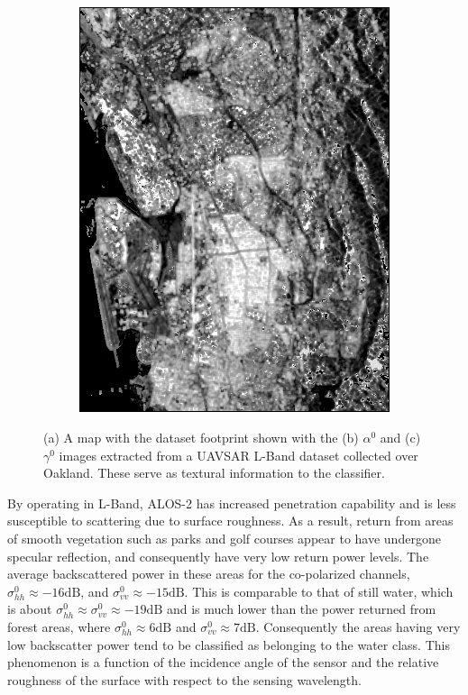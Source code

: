 \begin{figure}
\begin{subfigure}[t]{0.4\columnwidth}
	 \includegraphics[width = \columnwidth]{Figures/IGRASS15_WORK/gamma_5_5}
 	\caption{}
	 \end{subfigure}   
	 \caption{(a) A map with the dataset footprint shown with the (b) $\alpha^0$ and (c) $\gamma^0$ images extracted from a UAVSAR L-Band dataset collected over Oakland. These serve as textural information to the classifier.}
	 \label{fig:alphagamma}
\end{figure}


By operating in L-Band, ALOS-2 has increased penetration capability and is less susceptible to scattering due to surface roughness. As a result, return from areas of smooth vegetation such as parks and golf courses appear to have undergone specular reflection, and consequently have very low return power levels. The average backscattered power  in these areas for the co-polarized channels, $\sigma^0_{hh} \approx -16\mathrm{dB}$,  and $\sigma^0_{vv} \approx -15\mathrm{dB}$. This is comparable to that of still water, which is about $\sigma^0_{hh} \approx \sigma^0_{vv} \approx -19\mathrm{dB}$ and is much lower than the power returned from forest areas, where $\sigma^0_{hh} \approx 6\mathrm{dB}$ and $\sigma^0_{vv} \approx 7\mathrm{dB}$. Consequently the areas having very low backscatter power tend to be classified as belonging to the water class. This phenomenon is a function of the incidence angle of the sensor and the relative roughness of the surface  with respect to the sensing wavelength. 




